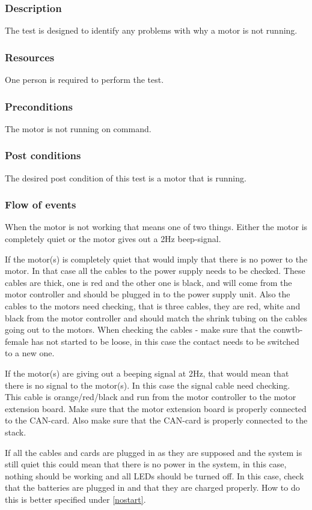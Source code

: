 \documentclass[10pt,a4paper]{article}
\begin{document}
\subsubsection*{Description}
The test is designed to identify any problems with why a motor is not running. 
\subsubsection*{Resources}
One person is required to perform the test. 
\subsubsection*{Preconditions}
The motor is not running on command.
\subsubsection*{Post conditions}
The desired post condition of this test is a motor that is running. 
\subsubsection*{Flow of events}
When the motor is not working that means one of two things. Either the motor is completely quiet or the motor gives out a 2Hz beep-signal. 

If the motor(s) is completely quiet that would imply that there is no power to the motor. In that case all the cables to the power supply needs to be checked. These cables are thick, one is red and the other one is black, and will come from the motor controller and should be plugged in to the power supply unit. Also the cables to the motors need checking, that is three cables, they are red, white and black from the motor controller and should match the shrink tubing on the cables going out to the motors. When checking the cables - make sure that the conwtb-female has not started to be loose, in this case the contact needs to be switched to a new one. 

If the motor(s) are giving out a beeping signal at 2Hz, that would mean that there is no signal to the motor(s). In this case the signal cable need checking. This cable is orange/red/black and run from the motor controller to the motor extension board. Make sure that the motor extension board is properly connected to the CAN-card. Also make sure that the CAN-card is properly connected to the stack.  

If all the cables and cards are plugged in as they are supposed and the system is still quiet this could mean that there is no power in the system, in this case, nothing should be working and all LEDs should be turned off. In this case, check that the batteries are plugged in and that they are charged properly. How to do this is better specified under \ref{nostart}.
\end{document}
